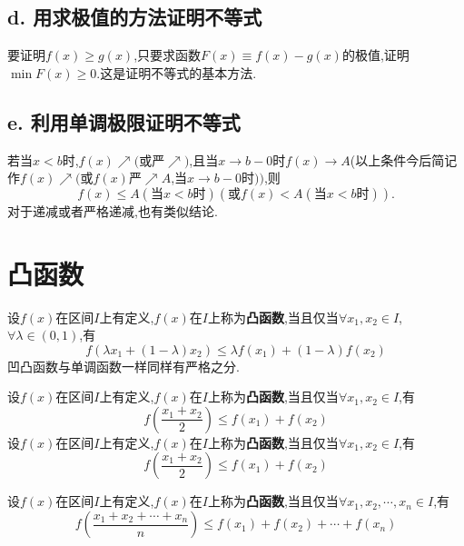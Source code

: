 			\subsection*{d. 用求极值的方法证明不等式}

			要证明$f\left( x \right) \ge g\left( x \right) $,只要求函数$F\left( x \right) \equiv f\left( x \right) -g\left( x \right) $的极值,证明$\min F\left( x \right) \ge 0$.这是证明不等式的基本方法.

			\subsection*{e. 利用单调极限证明不等式}

			若当$x<b$时,$f\left( x \right)\nearrow $$($或严$\nearrow$$)$,且当$x\rightarrow b-0$时$f\left( x \right) \rightarrow A$(以上条件今后简记作$f\left( x \right)\nearrow $$($或$f\left( x \right)$严$\nearrow A$,当$x\rightarrow b-0$时$))$,则
$$
	f\left( x \right) \le A\left( \text{当}x<b\text{时} \right) \left( \text{或}f\left( x \right) <A\left( \text{当}x<b\text{时} \right) \right) .
$$
对于递减或者严格递减,也有类似结论.

\section{凸函数}

\begin{definition} \label{def:tuhanshu0}
	设$f\left( x \right) $在区间$I$上有定义,$f\left( x \right) $在$I$上称为\textbf{凸函数},当且仅当$\forall x_1,x_2\in I$,$\forall \lambda \in \left( 0,1 \right) $,有
	$$
		f\left( \lambda x_1+\left( 1-\lambda \right) x_2 \right) \le \lambda f\left( x_1 \right) +\left( 1-\lambda \right) f\left( x_2 \right)
	$$
	凹凸函数与单调函数一样同样有严格之分.
\end{definition}

\begin{definition} \label{def:tuhanshu1}
	设$f\left( x \right) $在区间$I$上有定义,$f\left( x \right) $在$I$上称为\textbf{凸函数},当且仅当$\forall x_1,x_2\in I$,有
	$$
		f\left( \frac{x_1+x_2}{2} \right) \le f\left( x_1 \right) +f\left( x_2 \right)
	$$设$f\left( x \right) $在区间$I$上有定义,$f\left( x \right) $在$I$上称为\textbf{凸函数},当且仅当$\forall x_1,x_2\in I$,有
	$$
		f\left( \frac{x_1+x_2}{2} \right) \le f\left( x_1 \right) +f\left( x_2 \right)
	$$
\end{definition}

\begin{corollary} \label{cor:tuhanshu0}
	设$f\left( x \right) $在区间$I$上有定义,$f\left( x \right) $在$I$上称为\textbf{凸函数},当且仅当$\forall x_1,x_2,\cdots ,x_n\in I$,有
	$$
		f\left( \frac{x_1+x_2+\cdots +x_n}{n} \right) \le f\left( x_1 \right) +f\left( x_2 \right) +\cdots +f\left( x_n \right)
	$$
\end{corollary}

